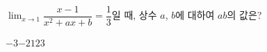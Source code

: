 $\displaystyle\lim_{x\to 1} \dfrac{x-1}{x^2+ax+b}=\dfrac{1}{3}$일 때, 상수 $a$, $b$에 대하여 $ab$의 값은?
\begin{choices32}{$-3$}{$-2$}{$1$}{$2$}{$3$}\end{choices32}
